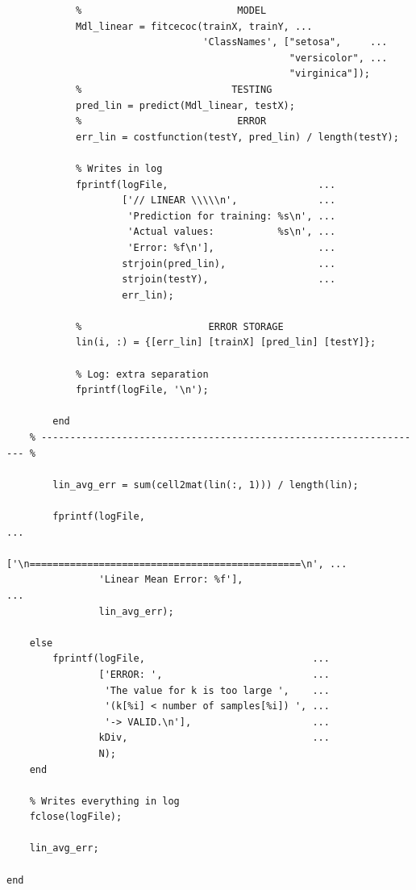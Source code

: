 \documentclass[11pt]{article}
\begin{document}
\begin{verbatim}
            %                           MODEL
            Mdl_linear = fitcecoc(trainX, trainY, ...
                                  'ClassNames', ["setosa",     ...
                                                 "versicolor", ...
                                                 "virginica"]);
            %                          TESTING
            pred_lin = predict(Mdl_linear, testX);
            %                           ERROR
            err_lin = costfunction(testY, pred_lin) / length(testY);

            % Writes in log
            fprintf(logFile,                          ...
                    ['// LINEAR \\\\\n',              ...
                     'Prediction for training: %s\n', ...
                     'Actual values:           %s\n', ...
                     'Error: %f\n'],                  ...
                    strjoin(pred_lin),                ...
                    strjoin(testY),                   ...
                    err_lin);

            %                      ERROR STORAGE
            lin(i, :) = {[err_lin] [trainX] [pred_lin] [testY]};

            % Log: extra separation
            fprintf(logFile, '\n');

        end
    % ------------------------------------------------------------------- %

        lin_avg_err = sum(cell2mat(lin(:, 1))) / length(lin);

        fprintf(logFile,                                                ...
                ['\n===============================================\n', ...
                'Linear Mean Error: %f'],                               ...
                lin_avg_err);

    else
        fprintf(logFile,                             ...
                ['ERROR: ',                          ...
                 'The value for k is too large ',    ...
                 '(k[%i] < number of samples[%i]) ', ...
                 '-> VALID.\n'],                     ...
                kDiv,                                ...
                N);
    end

    % Writes everything in log
    fclose(logFile);

    lin_avg_err;

end
\end{verbatim}
\end{document}
